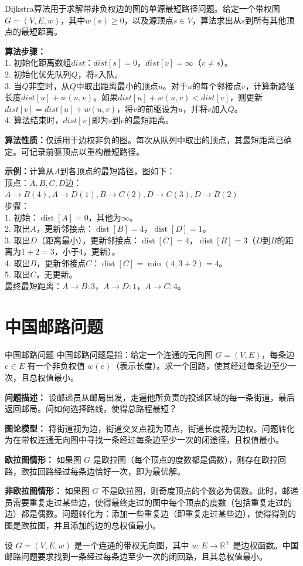 \documentclass[lang=cn,11pt]{elegantbook}
\begin{document}
Dijkstra算法用于求解带非负权边的图的单源最短路径问题。给定一个带权图$G=(V,E,w)$，其中$w(e)\geqslant 0$，以及源顶点$s\in V$，算法求出从$s$到所有其他顶点的最短距离。

\textbf{算法步骤：}\\
1. 初始化距离数组$dist$：$dist[s]=0$，$dist[v]=\infty$（$v\neq s$）。\\
2. 初始化优先队列$Q$，将$s$入队。\\
3. 当$Q$非空时，从$Q$中取出距离最小的顶点$u$。对于$u$的每个邻接点$v$，计算新路径长度$dist[u]+w(u,v)$。如果$dist[u]+w(u,v)<dist[v]$，则更新$dist[v]=dist[u]+w(u,v)$，将$v$的前驱设为$u$，并将$v$加入$Q$。\\
4. 算法结束时，$dist[v]$即为$s$到$v$的最短距离。

\textbf{算法性质：}仅适用于边权非负的图。每次从队列中取出的顶点，其最短距离已确定。可记录前驱顶点以重构最短路径。

\textbf{示例：}计算从$A$到各顶点的最短路径，图如下：\\
顶点：$A,B,C,D$\quad 边：$A\to B(4), A\to D(1), B\to C(2), D\to C(3), D\to B(2)$\\
步骤：\\
1. 初始：$\operatorname{dist}[A]=0$，其他为$\infty$。\\
2. 取出$A$，更新邻接点：$\operatorname{dist}[B]=4$，$\operatorname{dist}[D]=1$。
\\
3. 取出$D$（距离最小），更新邻接点：$\operatorname{dist}[C]=4$，$\operatorname{dist}[B]=3$（$D$到$B$的距离为$1+2=3$，小于4，更新）。\\
4. 取出$B$，更新邻接点$C$：$\operatorname{dist}[C]=\min(4,3+2)=4$。\\
5. 取出$C$，无更新。\\
最终最短距离：$A\to B:3$，$A\to D:1$，$A\to C:4$。

\section{中国邮路问题}
\begin{definition}{中国邮路问题}
    中国邮路问题是指：给定一个连通的无向图 $G=(V,E)$，每条边 $e\in E$ 有一个非负权值 $w(e)$（表示长度）。求一个回路，使其经过每条边至少一次，且总权值最小。

    \textbf{问题描述：}
    设邮递员从邮局出发，走遍他所负责的投递区域的每一条街道，最后返回邮局。问如何选择路线，使得总路程最短？

    \textbf{图论模型：}
    将街道视为边，街道交叉点视为顶点，街道长度视为边权。问题转化为在带权连通无向图中寻找一条经过每条边至少一次的闭途径，且权值最小。

    \textbf{欧拉图情形：}
    如果图 $G$ 是欧拉图（每个顶点的度数都是偶数），则存在欧拉回路，欧拉回路经过每条边恰好一次，即为最优解。

    \textbf{非欧拉图情形：}
    如果图 $G$ 不是欧拉图，则奇度顶点的个数必为偶数。此时，邮递员需要重复走过某些边，使得最终走过的图中每个顶点的度数（包括重复走过的边）都是偶数。问题转化为：添加一些重复边（即重复走过某些边），使得得到的图是欧拉图，并且添加的边的总权值最小。
\end{definition}
设 $G=(V,E,w)$ 是一个连通的带权无向图，其中 $w: E \to \mathbb{R}^+$ 是边权函数。中国邮路问题要求找到一条经过每条边至少一次的闭回路，且其总权值最小。
\end{document}
